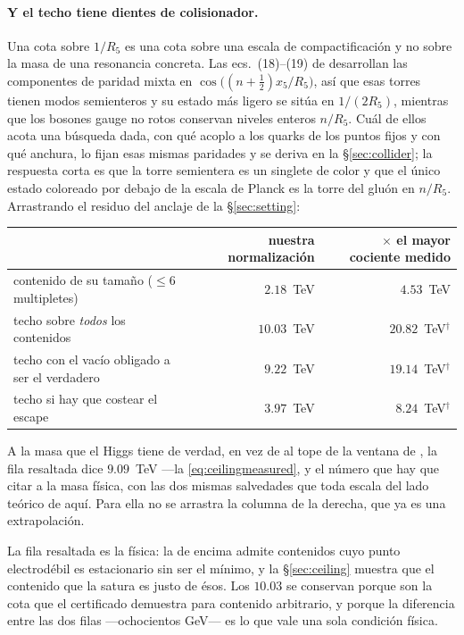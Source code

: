\documentclass[11pt,a4paper]{article}
\begin{document}
\paragraph{Y el techo tiene dientes de colisionador.} Una
cota sobre $1/R_5$ es una cota sobre una escala de compactificación y no sobre la masa de una
resonancia concreta. Las ecs.~(18)--(19) de \cite{KM25} desarrollan las componentes de paridad
mixta en $\cos\bigl((n+\tfrac12)x_5/R_5\bigr)$, así que esas torres tienen modos semienteros y su
estado más ligero se sitúa en $1/(2R_5)$, mientras que los bosones gauge no rotos conservan niveles
enteros $n/R_5$. Cuál de ellos acota una búsqueda dada, con qué acoplo a los quarks de los puntos
fijos y con qué anchura, lo fijan esas mismas paridades y se deriva en la \S\ref{sec:collider}; la
respuesta corta es que la torre semientera es un singlete de color y que el único estado coloreado
por debajo de la escala de Planck es la torre del gluón en $n/R_5$.
Arrastrando el residuo del anclaje de la \S\ref{sec:setting}:

\begin{center}\small
{}
\begin{tabular}{lrr}
\toprule
\rowcolor{hdrblue!10} & nuestra normalización & $\times$ el mayor cociente medido\\
\midrule
contenido de su tamaño ($\le6$ multipletes) & $2.18$~TeV & $4.53$~TeV\\
techo sobre \emph{todos} los contenidos & $10.03$~TeV & $20.82$~TeV$^{\dagger}$\\
\rowcolor{amber!14}techo con el vacío obligado a ser el verdadero & $9.22$~TeV & $19.14$~TeV$^{\dagger}$\\
techo si hay que costear el escape & $3.97$~TeV & $8.24$~TeV$^{\dagger}$\\
\bottomrule
\end{tabular}
\end{center}

\noindent A la masa que el Higgs tiene de verdad, en vez de al tope de la ventana de \cite{KM25},
la fila resaltada dice $9.09$~TeV ---la \eqref{eq:ceilingmeasured}, y el número que hay que citar a
la masa física, con las dos mismas salvedades que toda escala del lado teórico de aquí. Para ella
no se arrastra la columna de la derecha, que ya
es una extrapolación.

\noindent La fila resaltada es la física: la de encima admite contenidos cuyo punto electrodébil es
estacionario sin ser el mínimo, y la \S\ref{sec:ceiling} muestra que el contenido que la satura es
justo de ésos. Los $10.03$ se conservan porque son la cota que el certificado demuestra para
contenido arbitrario, y porque la diferencia entre las dos filas ---ochocientos GeV--- es lo que
vale una sola condición física.
\end{document}

